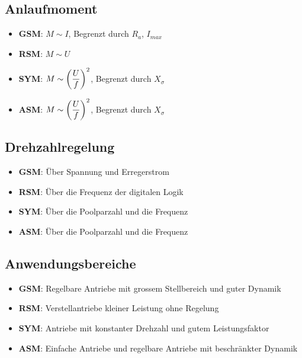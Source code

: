 \documentclass{article}
\begin{document}
\begin{twocolumn}
\subsection{Anlaufmoment}
\begin{itemize}
  \item \textbf{GSM}: $M \sim I$, Begrenzt durch $R_a$, $I_{max}$
  \item \textbf{RSM}: $M \sim U$
  \item \textbf{SYM}: $\displaystyle M \sim \left( \frac{U}{f} \right)^2$, Begrenzt durch $X_\sigma$
  \item \textbf{ASM}: $\displaystyle M \sim \left( \frac{U}{f} \right)^2$, Begrenzt durch $X_\sigma$
\end{itemize}

\subsection{Drehzahlregelung}
\begin{itemize}
  \item \textbf{GSM}: Über Spannung und Erregerstrom
  \item \textbf{RSM}: Über die Frequenz der digitalen Logik
  \item \textbf{SYM}: Über die Poolparzahl und die Frequenz
  \item \textbf{ASM}: Über die Poolparzahl und die Frequenz
\end{itemize}

\subsection{Anwendungsbereiche}
\begin{itemize}
  \item \textbf{GSM}: Regelbare Antriebe mit grossem Stellbereich und guter Dynamik
  \item \textbf{RSM}: Verstellantriebe kleiner Leistung ohne Regelung
  \item \textbf{SYM}: Antriebe mit konstanter Drehzahl und gutem Leistungsfaktor
  \item \textbf{ASM}: Einfache Antriebe und regelbare Antriebe mit beschränkter Dynamik
\end{itemize}

\end{twocolumn}
\end{document}
